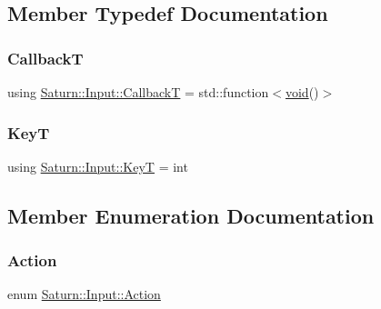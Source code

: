 \subsection{Member Typedef Documentation}
\mbox{\label{class_saturn_1_1_input_a317963f1b9872a1ef03ec40f56df4f4c}} 
\subsubsection{\texorpdfstring{CallbackT}{CallbackT}}
{\footnotesize\ttfamily using \mbox{\hyperlink{class_saturn_1_1_input_a317963f1b9872a1ef03ec40f56df4f4c}{Saturn\+::\+Input\+::\+CallbackT}} =  std\+::function$<$\mbox{\hyperlink{glad_8h_a950fc91edb4504f62f1c577bf4727c29}{void}}()$>$}

\mbox{\label{class_saturn_1_1_input_adb9bc8dbf6aa0a09f86efd787a96b768}} 
\subsubsection{\texorpdfstring{KeyT}{KeyT}}
{\footnotesize\ttfamily using \mbox{\hyperlink{class_saturn_1_1_input_adb9bc8dbf6aa0a09f86efd787a96b768}{Saturn\+::\+Input\+::\+KeyT}} =  int}



\subsection{Member Enumeration Documentation}
\mbox{\label{class_saturn_1_1_input_a504445f408b1575505008e8064633f07}} 
\subsubsection{\texorpdfstring{Action}{Action}}
{\footnotesize\ttfamily enum \mbox{\hyperlink{class_saturn_1_1_input_a504445f408b1575505008e8064633f07}{Saturn\+::\+Input\+::\+Action}}\hspace{0.3cm}{\ttfamily [strong]}}

